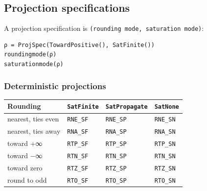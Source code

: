\subsection{Projection specifications}



\label{714366806163910976}{}


A projection specification is \texttt{(\allowbreak{}rounding mode, saturation mode)}:




\nopagebreak[4]
\begin{verbatim}
ρ = ProjSpec(TowardPositive(), SatFinite())
roundingmode(ρ)
saturationmode(ρ)
\end{verbatim}



\subsubsection{Deterministic projections}



\label{18424161794924729217}{}



\begin{table}[h]
\centering
\begin{tabulary}{\linewidth}{L L L L}
\toprule
Rounding & \texttt{SatFinite} & \texttt{SatPropagate} & \texttt{SatNone} \\
\toprule
nearest, ties even & \texttt{RNE\_\allowbreak{}SF} & \texttt{RNE\_\allowbreak{}SP} & \texttt{RNE\_\allowbreak{}SN} \\
nearest, ties away & \texttt{RNA\_\allowbreak{}SF} & \texttt{RNA\_\allowbreak{}SP} & \texttt{RNA\_\allowbreak{}SN} \\
toward +∞ & \texttt{RTP\_\allowbreak{}SF} & \texttt{RTP\_\allowbreak{}SP} & \texttt{RTP\_\allowbreak{}SN} \\
toward −∞ & \texttt{RTN\_\allowbreak{}SF} & \texttt{RTN\_\allowbreak{}SP} & \texttt{RTN\_\allowbreak{}SN} \\
toward zero & \texttt{RTZ\_\allowbreak{}SF} & \texttt{RTZ\_\allowbreak{}SP} & \texttt{RTZ\_\allowbreak{}SN} \\
round to odd & \texttt{RTO\_\allowbreak{}SF} & \texttt{RTO\_\allowbreak{}SP} & \texttt{RTO\_\allowbreak{}SN} \\
\bottomrule
\end{tabulary}

\end{table}



